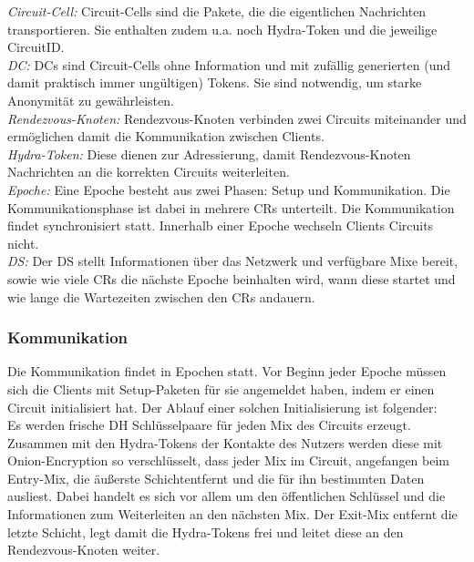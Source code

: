 \textit{Circuit-Cell:}
Circuit-Cells sind die Pakete, die die eigentlichen Nachrichten transportieren.
Sie enthalten zudem u.a. noch Hydra-Token und die jeweilige CircuitID.\\

\textit{\ac{DC}:}
\acp{DC} sind Circuit-Cells ohne Information und mit zufällig generierten (und damit praktisch immer ungültigen) Tokens.
Sie sind notwendig, um starke Anonymität zu gewährleisten.\\

\textit{Rendezvous-Knoten:}
Rendezvous-Knoten verbinden zwei Circuits miteinander und ermöglichen damit die Kommunikation zwischen Clients.\\

\textit{Hydra-Token:}
Diese dienen zur Adressierung, damit Rendezvous-Knoten Nachrichten an die korrekten Circuits weiterleiten.\\

\textit{Epoche:}
Eine Epoche besteht aus zwei Phasen: Setup und Kommunikation.
Die Kommunikationsphase ist dabei in mehrere \acp{CR} unterteilt.
Die Kommunikation findet synchronisiert statt.
Innerhalb einer Epoche wechseln Clients Circuits nicht.\\

\textit{\ac{DS}:}
Der \ac{DS} stellt Informationen über das Netzwerk und verfügbare Mixe bereit, sowie wie viele \acp{CR} die nächste Epoche beinhalten wird, wann diese startet und wie lange die Wartezeiten zwischen den \acp{CR} andauern.\\

\subsubsection{Kommunikation}
Die Kommunikation findet in Epochen statt.
Vor Beginn jeder Epoche müssen sich die Clients mit Setup-Paketen für sie angemeldet haben, indem er einen Circuit initialisiert hat.
Der Ablauf einer solchen Initialisierung ist folgender: \\
Es werden frische DH Schlüsselpaare für jeden Mix des Circuits erzeugt.
Zusammen mit den Hydra-Tokens der Kontakte des Nutzers werden diese mit Onion-Encryption so verschlüsselt, dass jeder Mix im Circuit, angefangen beim Entry-Mix, die äußerste \glqq Schicht\grqq \space entfernt und die für ihn bestimmten Daten ausliest.
Dabei handelt es sich vor allem um den öffentlichen Schlüssel und die Informationen zum Weiterleiten an den nächsten Mix.
Der Exit-Mix entfernt die letzte \glqq Schicht\grqq \space, legt damit die Hydra-Tokens frei und leitet diese an den Rendezvous-Knoten weiter.

